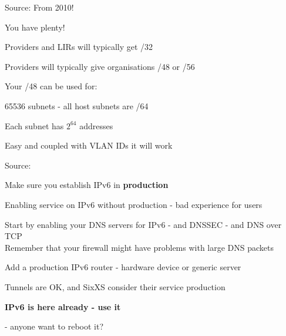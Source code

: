 \documentclass[20pt,landscape,a4paper,footrule]{foils}
\begin{document}
Source: From 2010!\\
{\footnotesize{}}



\begin{list1}
\item You have plenty!
\item Providers and LIRs will typically get /32
\item Providers will typically give organisations /48 or /56
\item Your /48 can be used for:
\begin{list2}
\item 65536 subnets - all host subnets are /64
\item Each subnet has $2^{64}$ addresses
\end{list2}
\end{list1}



\centerline{Easy and coupled with VLAN IDs it will work \smiley}

Source:
{\footnotesize {}}




\begin{list1}
\item Make sure you establish IPv6 in {\bf production}
\item Enabling service on IPv6 without production - bad experience for users
\item Start by enabling your DNS servers for IPv6 - and DNSSEC - and DNS over TCP\\
Remember that your firewall might have problems with large DNS packets
\item Add a production IPv6 router - hardware device or generic server
\item Tunnels are OK, and SixXS consider their service production
\end{list1}



\begin{center}
\vskip 5mm
{\color{titlecolor}\LARGE \bf IPv6 is here already - use it}
\vskip 5mm



 - anyone want to reboot it?

\end{center}
\end{document}
